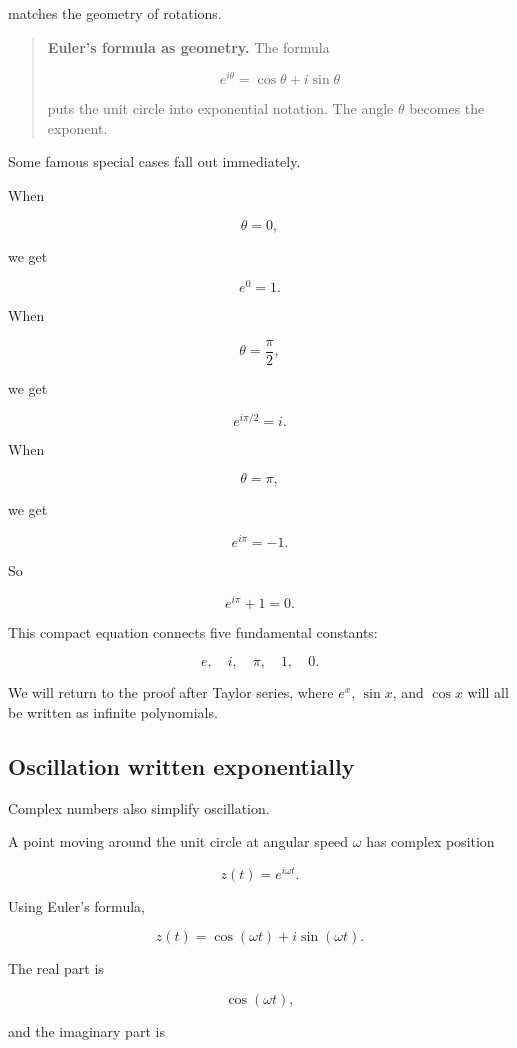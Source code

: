 matches the geometry of rotations.

\begin{quote}
\textbf{Euler's formula as geometry.}
The formula

\[
e^{i\theta}=\cos\theta+i\sin\theta
\]

puts the unit circle into exponential notation.  The angle \(\theta\) becomes the
exponent.
\end{quote}

Some famous special cases fall out immediately.

When

\[
\theta=0,
\]

we get

\[
e^{0}=1.
\]

When

\[
\theta=\frac{\pi}{2},
\]

we get

\[
e^{i\pi/2}=i.
\]

When

\[
\theta=\pi,
\]

we get

\[
e^{i\pi}=-1.
\]

So

\[
\boxed{
e^{i\pi}+1=0.
}
\]

This compact equation connects five fundamental constants:

\[
e,\quad i,\quad \pi,\quad 1,\quad 0.
\]

We will return to the proof after Taylor series, where \(e^x\), \(\sin x\), and \(\cos x\)
will all be written as infinite polynomials.

\subsection{Oscillation written exponentially}
\label{subsec:oscillation-written-exponentially}

Complex numbers also simplify oscillation.

A point moving around the unit circle at angular speed \(\omega\) has complex position

\[
z(t)=e^{i\omega t}.
\]

Using Euler's formula,

\[
z(t)=\cos(\omega t)+i\sin(\omega t).
\]

The real part is

\[
\cos(\omega t),
\]

and the imaginary part is

